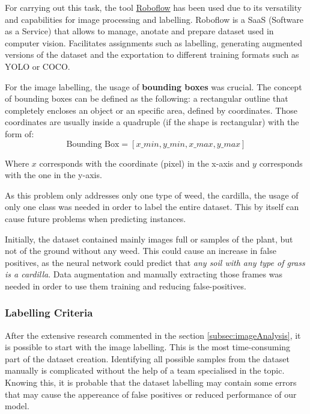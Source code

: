 \documentclass[12pt]{report} %
\begin{document}
For carrying out this task, the tool \href{https://roboflow.com/}{Roboflow} has been used due to its versatility and capabilities for image processing and labelling. Roboflow is a SaaS (Software as a Service) that allows to manage, anotate and prepare dataset used in computer vision. Facilitates assignments such as labelling, generating augmented versions of the dataset and the exportation to different training formats such as YOLO or COCO.

For the image labelling, the usage of \textbf{bounding boxes} was crucial. The concept of bounding boxes can be defined as the following: a rectangular outline that completely encloses an object or an specific area, defined by coordinates. Those coordinates are usually inside a quadruple (if the shape is rectangular) with the form of:
$$\text{Bounding Box} = [x\_min, y\_min, x\_max, y\_max]$$

Where $x$ corresponds with the coordinate (pixel) in the x-axis and $y$ corresponds with the one in the y-axis.

As this problem only addresses only one type of weed, the cardilla, the usage of only one class was needed in order to label the entire dataset. This by itself can cause future problems when predicting instances.

Initially, the dataset contained mainly images full or samples of the plant, but not of the ground without any weed. This could cause an increase in false positives, as the neural network could predict that \textit{any soil with any type of grass is a cardilla}. Data augmentation and manually extracting those frames was needed in order to use them training and reducing false-positives.


\subsubsection{Labelling Criteria}

After the extensive research commented in the section \ref{subsec:imageAnalysis}, it is possible to start with the image labelling. This is the most time-consuming part of the dataset creation. Identifying  all possible samples from the dataset manually is complicated without the help of a team specialised in the topic. Knowing this, it is probable that the dataset labelling may contain some errors that may cause the appereance of false positives or reduced performance of our model.
\end{document}
